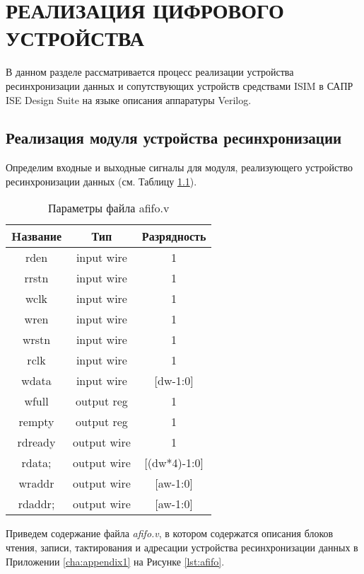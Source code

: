 \chapter{РЕАЛИЗАЦИЯ ЦИФРОВОГО УСТРОЙСТВА}

В данном разделе рассматривается процесс реализации устройства ресинхронизации данных и сопутствующих устройств средствами ISIM в САПР ISE Design Suite на языке описания аппаратуры Verilog.

\section{Реализация модуля устройства ресинхронизации}

Определим входные и выходные сигналы для модуля, реализующего устройство ресинхронизации данных (см. Таблицу \ref{tab:afifo-params}).

\begin{table}[htbp]
	\caption{Параметры файла afifo.v}
	\centering
	\fontsize{12}{16pt}
	\begin{tabular}{|c|c|c|}
		\hline
		\multicolumn{1}{|c}{\textbf{Hазвание}}& \multicolumn{1}{|c}{\textbf{Тип}} & \multicolumn{1}{|c|}{\textbf{Разрядность}} \\ \hline
		rden & input wire & 1 \\ \hline
		rrstn & input wire & 1 \\ \hline
		wclk & input wire & 1 \\ \hline
		wren & input wire & 1 \\ \hline
		wrstn & input wire & 1 \\ \hline
		rclk & input wire & 1 \\ \hline
		wdata & input wire &   [dw-1:0]  \\ \hline
		wfull & output	  reg  & 1 \\ \hline
		rempty & output	  reg	 & 1 \\ \hline
		rdready & output    wire  & 1 \\ \hline
		rdata; & output	  wire  & [(dw*4)-1:0]  \\ \hline
		wraddr & output    wire  & [aw-1:0]  \\ \hline
		rdaddr; & output    wire  & [aw-1:0]  \\ \hline
	\end{tabular}\label{tab:afifo-params}
\end{table}

Приведем содержание файла \textit{afifo.v}, в котором содержатся описания блоков чтения, записи, тактирования и адресации устройства ресинхронизации данных в Приложении \ref{cha:appendix1} на Рисунке \ref{lst:afifo}.


